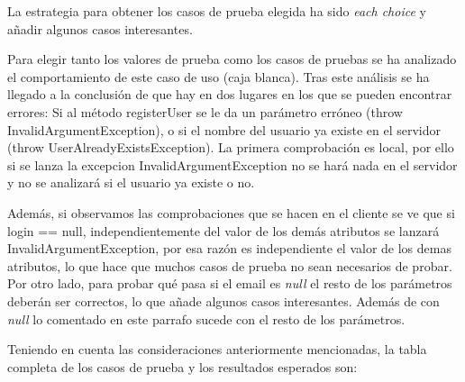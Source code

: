 La estrategia para obtener los casos de prueba elegida ha sido \textit{each choice} y añadir algunos casos interesantes.

Para elegir tanto los valores de prueba como los casos de pruebas se ha analizado el comportamiento de este caso de uso (caja blanca). Tras este análisis se ha llegado a la conclusión de que hay en dos lugares en los que se pueden encontrar errores: Si al método registerUser se le da un parámetro erróneo (throw InvalidArgumentException), o si el nombre del usuario ya existe en el servidor (throw UserAlreadyExistsException). La primera comprobación es local, por ello si se lanza la excepcion InvalidArgumentException no se hará nada en el servidor y no se analizará si el usuario ya existe o no.

Además, si observamos las comprobaciones que se hacen en el cliente se ve que si login == null, independientemente del valor de los demás atributos se lanzará  InvalidArgumentException, por esa razón es independiente el valor de los demas atributos, lo que hace que muchos casos de prueba no sean necesarios de probar. Por otro lado, para probar qué pasa si el email es \textit{null} el resto de los parámetros deberán ser correctos, lo que añade algunos casos interesantes. Además de con \textit{null} lo comentado en este parrafo sucede con el resto de los parámetros. 


Teniendo en cuenta las consideraciones anteriormente mencionadas, la tabla completa de los casos de prueba y los resultados esperados son:

